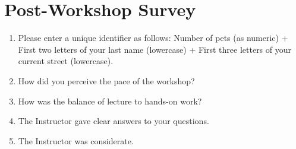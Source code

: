 \documentclass[12pt]{article}
\begin{document}
\def\spacingset#1{\renewcommand{\baselinestretch}%
{#1}\small\normalsize} \spacingset{1}

\section*{Post-Workshop Survey}

\begin{enumerate}
    \item Please enter a unique identifier as follows: Number of pets (as numeric) + First two letters
of your last name (lowercase) + First three letters of your current street (lowercase).

    \item How did you perceive the pace of the workshop? 
        
    \item How was the balance of lecture to hands-on work?
    
    \item The Instructor gave clear answers to your questions.
        
    \item The Instructor was considerate.
    

\end{enumerate}
\end{document}

